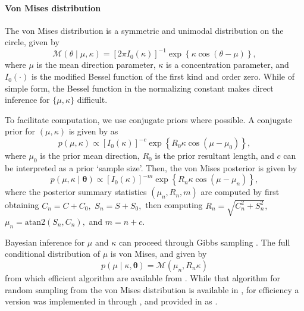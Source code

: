 \hypertarget{von-mises-distribution}{%
\paragraph{Von Mises distribution}\label{von-mises-distribution}}

\label{vonmisespost}

The von Mises distribution is a symmetric and unimodal distribution on
the circle, given by \begin{equation}
\mathcal{M}(\theta \mid \mu, \kappa) = [2 \pi I_0(\kappa)]^{-1} \exp \left\{ \kappa \cos(\theta - \mu) \right\},
\end{equation} where \(\mu\) is the mean direction parameter, \(\kappa\)
is a concentration parameter, and \(I_0(\cdot)\) is the modified Bessel
function of the first kind and order zero. While of simple form, the
Bessel function in the normalizing constant makes direct inference for
\(\{\mu, \kappa\}\) difficult.

To facilitate computation, we use conjugate priors where possible. A
conjugate prior for \((\mu, \kappa)\) is given by
\citet{guttorp1988finding} as \begin{equation} \label{eqn:vmconjprior}
p(\mu, \kappa) \propto [I_0(\kappa)]^{-c}  \exp \left\{ R_0 \kappa \cos(\mu - \mu_0) \right\},
\end{equation} where \(\mu_0\) is the prior mean direction, \(R_0\) is
the prior resultant length, and \(c\) can be interpreted as a prior
`sample size'. Then, the von Mises posterior is given by
\begin{equation}
p(\mu, \kappa \mid \boldsymbol{\theta}) \propto [I_0(\kappa)]^{-m}  \exp \left\{ R_n \kappa \cos(\mu - \mu_n) \right\},
\end{equation} where the posterior summary statistics
\((\mu_n, R_n, m)\) are computed by first obtaining \(C_n = C + C_0,\)
\(S_n = S + S_0,\) then computing \(R_n = \sqrt{C_n^2 + S_n^2},\)
\(\mu_n = \text{atan2}(S_n, C_n),\) and \(m = n + c\).

Bayesian inference for \(\mu\) and \(\kappa\) can proceed through Gibbs
sampling \citep{chib1995understanding}. The full conditional
distribution of \(\mu\) is von Mises, and given by \begin{equation}
p(\mu \mid \kappa, \boldsymbol{\theta}) = \mathcal{M}(\mu_n, R_n \kappa)
\end{equation} from which efficient algorithm are available from
\citet{best1981bias}. While that algorithm for random sampling from the
von Mises distribution is available in , for efficiency a
version was implemented in  through 
\citep{rcpp}, and provided in  as .

